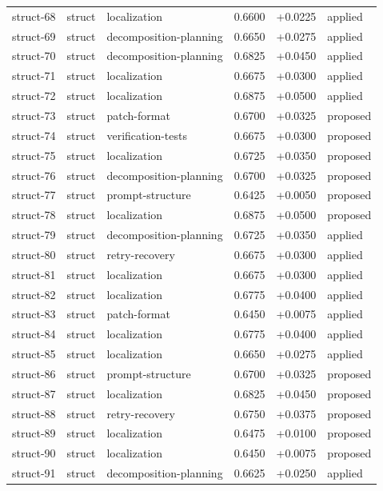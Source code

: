 \begin{center}
\begin{longtable}{llp{5.2cm}rrl}
struct-68 & struct & localization & 0.6600 & +0.0225 & applied \\
struct-69 & struct & decomposition-planning & 0.6650 & +0.0275 & applied \\
struct-70 & struct & decomposition-planning & 0.6825 & +0.0450 & applied \\
struct-71 & struct & localization & 0.6675 & +0.0300 & applied \\
struct-72 & struct & localization & 0.6875 & +0.0500 & applied \\
struct-73 & struct & patch-format & 0.6700 & +0.0325 & proposed \\
struct-74 & struct & verification-tests & 0.6675 & +0.0300 & proposed \\
struct-75 & struct & localization & 0.6725 & +0.0350 & proposed \\
struct-76 & struct & decomposition-planning & 0.6700 & +0.0325 & proposed \\
struct-77 & struct & prompt-structure & 0.6425 & +0.0050 & proposed \\
struct-78 & struct & localization & 0.6875 & +0.0500 & proposed \\
struct-79 & struct & decomposition-planning & 0.6725 & +0.0350 & applied \\
struct-80 & struct & retry-recovery & 0.6675 & +0.0300 & applied \\
struct-81 & struct & localization & 0.6675 & +0.0300 & applied \\
struct-82 & struct & localization & 0.6775 & +0.0400 & applied \\
struct-83 & struct & patch-format & 0.6450 & +0.0075 & applied \\
struct-84 & struct & localization & 0.6775 & +0.0400 & applied \\
struct-85 & struct & localization & 0.6650 & +0.0275 & applied \\
struct-86 & struct & prompt-structure & 0.6700 & +0.0325 & proposed \\
struct-87 & struct & localization & 0.6825 & +0.0450 & proposed \\
struct-88 & struct & retry-recovery & 0.6750 & +0.0375 & proposed \\
struct-89 & struct & localization & 0.6475 & +0.0100 & proposed \\
struct-90 & struct & localization & 0.6450 & +0.0075 & proposed \\
struct-91 & struct & decomposition-planning & 0.6625 & +0.0250 & applied \\

\end{longtable}
\end{center}
